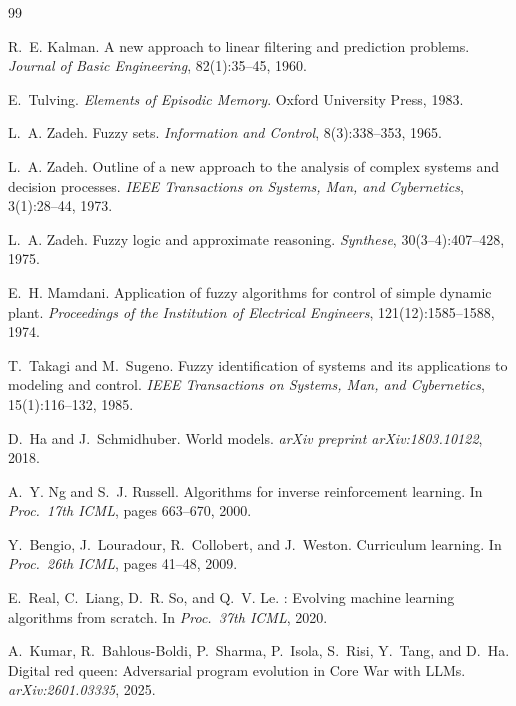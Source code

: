 \documentclass[12pt,a4paper]{article}
\begin{document}

\begin{thebibliography}{99}

R.~E. Kalman.
\newblock A new approach to linear filtering and prediction problems.
\newblock \emph{Journal of Basic Engineering}, 82(1):35--45, 1960.

E.~Tulving.
\newblock \emph{Elements of Episodic Memory}.
\newblock Oxford University Press, 1983.

L.~A. Zadeh.
\newblock Fuzzy sets.
\newblock \emph{Information and Control}, 8(3):338--353, 1965.

L.~A. Zadeh.
\newblock Outline of a new approach to the analysis of complex systems and
  decision processes.
\newblock \emph{IEEE Transactions on Systems, Man, and Cybernetics},
  3(1):28--44, 1973.

L.~A. Zadeh.
\newblock Fuzzy logic and approximate reasoning.
\newblock \emph{Synthese}, 30(3--4):407--428, 1975.

E.~H. Mamdani.
\newblock Application of fuzzy algorithms for control of simple dynamic plant.
\newblock \emph{Proceedings of the Institution of Electrical Engineers},
  121(12):1585--1588, 1974.

T.~Takagi and M.~Sugeno.
\newblock Fuzzy identification of systems and its applications to modeling and
  control.
\newblock \emph{IEEE Transactions on Systems, Man, and Cybernetics},
  15(1):116--132, 1985.

D.~Ha and J.~Schmidhuber.
\newblock World models.
\newblock \emph{arXiv preprint arXiv:1803.10122}, 2018.

A.~Y. Ng and S.~J. Russell.
\newblock Algorithms for inverse reinforcement learning.
\newblock In \emph{Proc.\ 17th ICML}, pages 663--670, 2000.

Y.~Bengio, J.~Louradour, R.~Collobert, and J.~Weston.
\newblock Curriculum learning.
\newblock In \emph{Proc.\ 26th ICML}, pages 41--48, 2009.

E.~Real, C.~Liang, D.~R. So, and Q.~V. Le.
: Evolving machine learning algorithms from scratch.
\newblock In \emph{Proc.\ 37th ICML}, 2020.

A.~Kumar, R.~Bahlous-Boldi, P.~Sharma, P.~Isola, S.~Risi, Y.~Tang,
  and D.~Ha.
\newblock Digital red queen: Adversarial program evolution in {C}ore {W}ar
  with {LLM}s.
\newblock \emph{arXiv:2601.03335}, 2025.


\end{thebibliography}
\end{document}
